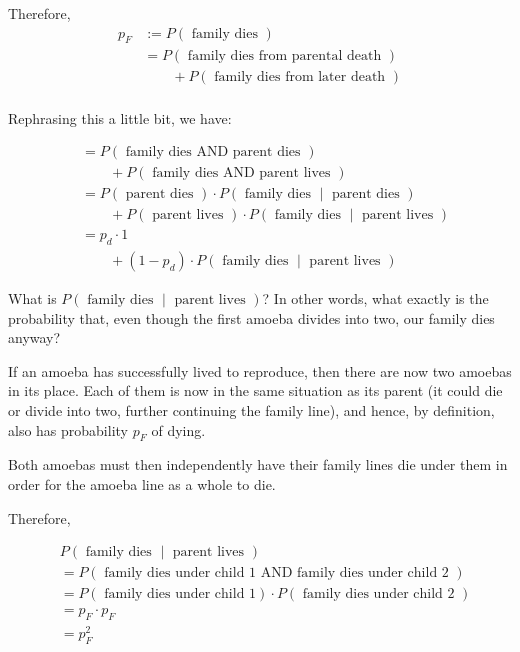 Therefore, 
\begin{align*}
p_F &:= P(\text{ family dies }) \\
&= P(\text{ family dies from parental death }) \\
&\qquad + P(\text{ family dies from later death }) \\ %
\end{align*}

Rephrasing this a little bit, we have:

\begin{align*}
&= P(\text{ family dies AND parent dies }) \\
&\qquad + P(\text{ family dies AND parent lives }) \\
&= P(\text{ parent dies }) \cdot P\left(\text{ family dies } \middle| \text{ parent dies }\right) \\
&\qquad + P(\text{ parent lives }) \cdot P\left(\text{ family dies } \middle| \text{ parent lives }\right) \\
&= p_d \cdot 1 \\
&\qquad + (1 - p_d) \cdot P\left(\text{ family dies } \middle| \text{ parent lives }\right)
\end{align*}

What is $P\left(\text{ family dies } \middle| \text{ parent lives }\right)$? In other words, what exactly is the probability that, even though the first amoeba divides into two, our family dies anyway?

If an amoeba has successfully lived to reproduce, then there are now two amoebas in its place. Each of them is now in the same situation as its parent (it could die or divide into two, further continuing the family line), and hence, by definition, also has probability $p_F$ of dying. 

Both amoebas must then independently have their family lines die under them in order for the amoeba line as a whole to die.

Therefore, 

\begin{align*}
&P\left(\text{ family dies } \middle| \text{ parent lives }\right) \\
&= P\left(\text{ family dies under child 1 AND family dies under child 2 } \right) \\
&= P\left(\text{ family dies under child 1} \right) \cdot P\left(\text{ family dies under child 2 } \right) \\
&= p_F \cdot p_F \\
&= p_F^2
\end{align*}

